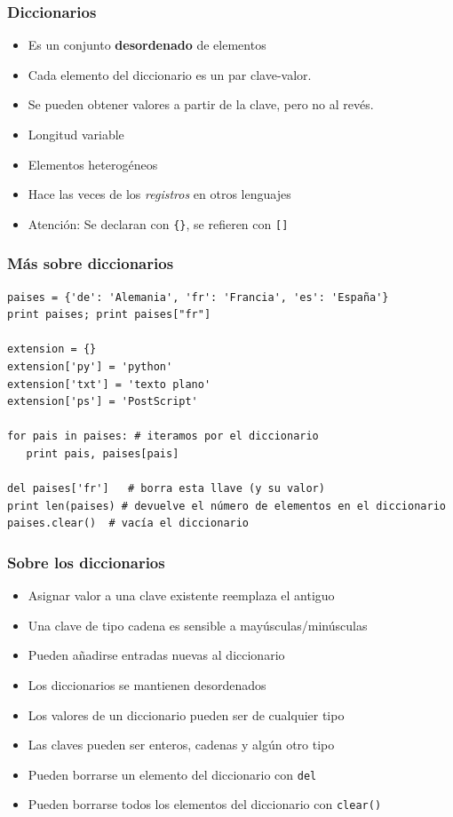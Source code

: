 \documentclass{beamer}
\begin{document}
\begin{frame}[fragile]
\frametitle{Diccionarios}  

\begin{itemize}
\item Es un conjunto {\bf desordenado} de elementos 
\item Cada elemento del diccionario es un par clave-valor. 
\item Se pueden obtener valores a partir de la clave, pero no al revés.
\item Longitud variable
\item Elementos heterogéneos
\item Hace las veces de los \emph{registros} en otros lenguajes
\item Atención: Se declaran con \verb|{}|, se refieren con \verb|[]|
\end{itemize}
\end{frame}


\begin{frame}[fragile]
\frametitle{Más sobre diccionarios}
  \begin{footnotesize}
\begin{verbatim}
paises = {'de': 'Alemania', 'fr': 'Francia', 'es': 'España'}
print paises; print paises["fr"]

extension = {}
extension['py'] = 'python'
extension['txt'] = 'texto plano'
extension['ps'] = 'PostScript'

for pais in paises: # iteramos por el diccionario
   print pais, paises[pais]

del paises['fr']   # borra esta llave (y su valor)
print len(paises) # devuelve el número de elementos en el diccionario
paises.clear()  # vacía el diccionario

\end{verbatim}
  \end{footnotesize}

\end{frame}


\begin{frame}[fragile]
\frametitle{Sobre los diccionarios}  

  \begin{itemize}
  \item Asignar valor a una clave existente reemplaza el antiguo 
  \item Una clave de tipo cadena es sensible a mayúsculas/minúsculas
  \item Pueden añadirse entradas nuevas al diccionario
  \item Los diccionarios se mantienen desordenados
\item Los valores de un diccionario pueden ser de cualquier tipo
\item Las claves pueden ser enteros, cadenas y algún otro tipo
\item Pueden borrarse un elemento del diccionario con \verb|del|
\item Pueden borrarse todos los elementos del diccionario con \verb|clear()|
\end{itemize}

\end{frame}
\end{document}
